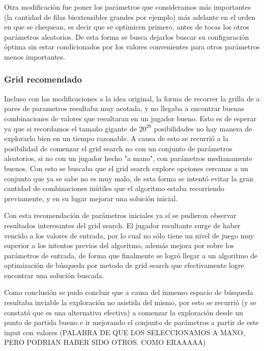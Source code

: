 \documentclass[A4paper,oneside,fleqn,11pt]{article}
\theoremstyle{definition}
\begin{document}
Otra modificación fue poner los parámetros que consideramos más importantes (la cantidad de filas biextensibles grandes por ejemplo) más adelante en el orden en que se chequean, es decir que se optimicen primero, antes de tocas los otros parámetros aleatorios. De esta forma se busca dejarlos buscar su configuración óptima sin estar condicionados por los valores convenientes para otros parámetros menos importantes.



\subsubsection{Grid recomendado}

Incluso con las modificaciones a la idea original, la forma de recorrer la grilla de a pares de parametros resultaba muy acotada, y no llegaba a encontrar buenas combinaciones de valores que resultaran en un jugador bueno. Esto es de esperar ya que si recordamos el tamaño gigante de $ 20^{28}$ posibilidades no hay manera de explorarlo bien en un tiempo razonable. A causa de esto se recurrió a la posibilidad de comenzar el grid search no con un conjunto de parámetros aleatorios, si no con un jugador hecho "a mano", con parámetros medianamente buenos. Con esto se buscaba que el grid search explore opciones cercanas a un conjunto que ya se sabe no es muy malo, de esta forma se intentó evitar la gran cantidad de combinaciones inútiles que el algoritmo estaba recorriendo previamente, y en su lugar mejorar una solución inicial.

Con esta recomendación de parámetros iniciales ya sí se pudieron observar resultados interesantes del grid search. El jugador resultante surge de haber vencido a los valores de entrada, por lo cual no sólo tiene un nivel de juego muy superior a los intentos previos del algoritmo, además mejora por sobre los parámetros de entrada, de forma que finalmente se logró llegar a un algoritmo de optimización de búsqueda por metodo de grid search que efectivamente logre encontrar una solución buscada.

Como conclusión se pudo concluir que a causa del inmenso espacio de búsqueda resultaba inviable la exploración no asistida del mismo, por esto se recurrió (y se constató que es una alternativa efectiva) a comenzar la exploración desde un punto de partida bueno e ir mejorando el conjunto de parámetros a partir de este input con valores (PALABRA DE QUE LOS SELECCIONAMOS A MANO, PERO PODRIAN HABER SIDO OTROS. COMO ERAAAAA)
\end{document}
